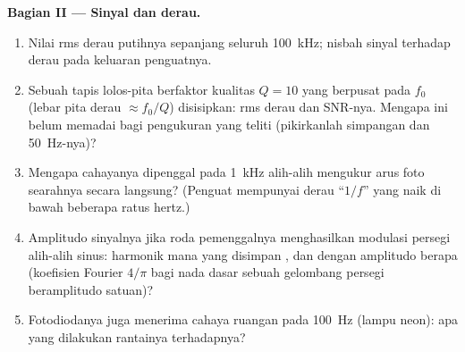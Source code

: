 \begin{problem}
\medskip
\noindent\textbf{Bagian II --- Sinyal dan derau.}
\begin{enumerate}[resume]
  \item Nilai rms derau putihnya sepanjang seluruh \qty{100}{kHz};
        nisbah sinyal terhadap derau pada keluaran penguatnya.
  \item Sebuah tapis lolos-pita berfaktor kualitas $Q = 10$ yang berpusat pada $f_0$
        (lebar pita derau $\approx f_0/Q$) disisipkan: rms derau dan SNR-nya.
        Mengapa ini belum memadai bagi pengukuran yang teliti (pikirkanlah
        simpangan dan \qty{50}{Hz}-nya)?
  \item Mengapa cahayanya dipenggal pada \qty{1}{kHz} alih-alih mengukur arus
        foto searahnya secara langsung? (Penguat mempunyai derau ``$1/f$'' yang naik
        di bawah beberapa ratus hertz.)
  \item Amplitudo sinyalnya jika roda pemenggalnya menghasilkan modulasi
        persegi alih-alih sinus: harmonik mana yang disimpan , dan dengan amplitudo berapa (koefisien Fourier $4/\pi$ bagi
        nada dasar sebuah gelombang persegi beramplitudo satuan)?
  \item Fotodiodanya juga menerima cahaya ruangan pada \qty{100}{Hz}
        (lampu neon): apa yang dilakukan rantainya terhadapnya?
\end{enumerate}


\end{problem}
